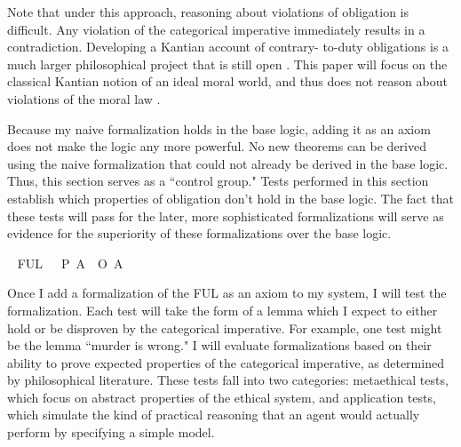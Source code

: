 \begin{isabellebody}
\begin{isamarkuptext}
Note that under this approach, reasoning about violations of obligation is difficult. Any violation of the 
categorical imperative immediately results in a contradiction. Developing a Kantian account of contrary-
to-duty obligations is a much larger philosophical project that is still open \cite{KorsgaardRTL}. This paper will focus 
on the classical Kantian notion of an ideal moral world, and thus does not reason about violations 
of the moral law \cite{idealtheory}.

Because my naive formalization holds in the base logic, adding it as an axiom does not make the logic
any more powerful. No new theorems can be derived using the naive formalization that could not already
be derived in the base logic. Thus, this section serves as a ``control group." Tests performed in this
section establish which properties of obligation don't hold in the base logic. The fact that these 
tests will pass for the later, more sophisticated formalizations will serve as evidence for the superiority
of these formalizations over the base logic.%
\end{isamarkuptext}\isamarkuptrue%
\isamarkupfalse%
\ \isanewline
FUL{\isacharunderscore}{}{\isacharcolon}\ {\isachardoublequoteopen}{\isasymTurnstile}\ {\isacharparenleft}{\isacharparenleft}\isactrlbold {\isasymnot}{\isacharparenleft}{\isasymbox}\ {\isacharparenleft}P\ A{\isacharparenright}{\isacharparenright}{\isacharparenright}\ \isactrlbold {\isasymrightarrow}\ {\isacharparenleft}O\ {\isacharbraceleft}{\isacharparenleft}\isactrlbold {\isasymnot}A{\isacharparenright}{\isacharbraceright}{\isacharparenright}{\isacharparenright}{\isachardoublequoteclose}%
\begin{isamarkuptext}%
Once I add a formalization of the FUL as an axiom to my system, I will test the formalization.
Each test will take the form of a lemma which I expect to either hold or be disproven by the categorical
imperative. For example, one test might be the lemma ``murder is wrong." I will evaluate formalizations
based on their ability to prove expected properties of the categorical imperative, as determined by 
philosophical literature. These tests fall into two categories: metaethical tests, which focus on 
abstract properties of the ethical system, and application tests, which simulate the kind of practical reasoning 
that an agent would actually perform by specifying a simple model. 


\end{isamarkuptext}
\end{isabellebody}
